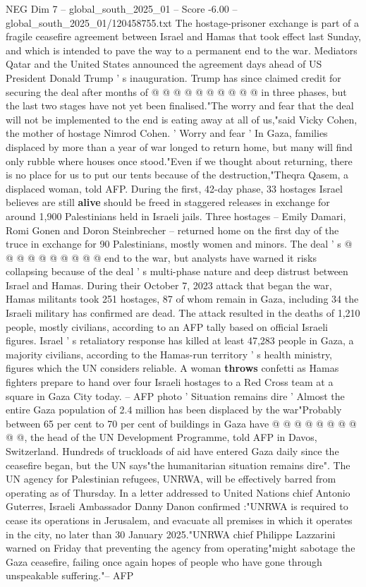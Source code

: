 \begin{textsample}{NEG Dim 7 – global\_south\_2025\_01 – Score -6.00 – global\_south\_2025\_01/120458755.txt}
The hostage-prisoner exchange is part of a fragile ceasefire agreement between Israel and Hamas that took effect last Sunday, and which is intended to pave the way to a permanent end to the war.
Mediators Qatar and the United States announced the agreement days ahead of US President Donald Trump ' s inauguration.
Trump has since claimed credit for securing the deal after months of @ @ @ @ @ @ @ @ @ @ in three phases, but the last two stages have not yet been finalised."The worry and fear that the deal will not be implemented to the end is eating away at all of us,"said Vicky Cohen, the mother of hostage Nimrod Cohen. ' Worry and fear ' In Gaza, families displaced by more than a year of war longed to return home, but many will find only rubble where houses once stood."Even if we thought about returning, there is no place for us to put our tents because of the destruction,"Theqra Qasem, a displaced woman, told AFP.
During the first, 42-day phase, 33 hostages Israel believes are still \textbf{alive} should be freed in staggered releases in exchange for around 1,900 Palestinians held in Israeli jails.
Three hostages -- Emily Damari, Romi Gonen and Doron Steinbrecher -- returned home on the first day of the truce in exchange for 90 Palestinians, mostly women and minors.
The deal ' s @ @ @ @ @ @ @ @ @ @ end to the war, but analysts have warned it risks collapsing because of the deal ' s multi-phase nature and deep distrust between Israel and Hamas.
During their October 7, 2023 attack that began the war, Hamas militants took 251 hostages, 87 of whom remain in Gaza, including 34 the Israeli military has confirmed are dead.
The attack resulted in the deaths of 1,210 people, mostly civilians, according to an AFP tally based on official Israeli figures.
Israel ' s retaliatory response has killed at least 47,283 people in Gaza, a majority civilians, according to the Hamas-run territory ' s health ministry, figures which the UN considers reliable.
A woman \textbf{throws} confetti as Hamas fighters prepare to hand over four Israeli hostages to a Red Cross team at a square in Gaza City today. -- AFP photo ' Situation remains dire ' Almost the entire Gaza population of 2.4 million has been displaced by the war"Probably between 65 per cent to 70 per cent of buildings in Gaza have @ @ @ @ @ @ @ @ @ @, the head of the UN Development Programme, told AFP in Davos, Switzerland.
Hundreds of truckloads of aid have entered Gaza daily since the ceasefire began, but the UN says"the humanitarian situation remains dire".
The UN agency for Palestinian refugees, UNRWA, will be effectively barred from operating as of Thursday.
In a letter addressed to United Nations chief Antonio Guterres, Israeli Ambassador Danny Danon confirmed :"UNRWA is required to cease its operations in Jerusalem, and evacuate all premises in which it operates in the city, no later than 30 January 2025."UNRWA chief Philippe Lazzarini warned on Friday that preventing the agency from operating"might sabotage the Gaza ceasefire, failing once again hopes of people who have gone through unspeakable suffering."-- AFP

\end{textsample}
